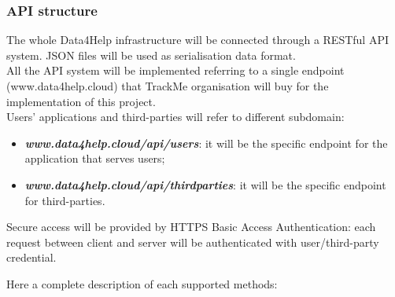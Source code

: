 \documentclass[DD.tex]{subfiles}
\begin{document}
\newpage

\subsubsection{API structure}
The whole Data4Help infrastructure will be connected through a RESTful API system. JSON files will be used as serialisation data format.\\
All the API system will be implemented referring to a single endpoint (www.data4help.cloud) that TrackMe organisation will buy for the implementation of this project.
\\Users' applications and third-parties will refer to different subdomain:

\begin{itemize}
	\item \textit{\textbf{www.data4help.cloud/api/users}}: it will be the specific endpoint for the application that serves users;
	\item \textit{\textbf{www.data4help.cloud/api/thirdparties}}: it will be the specific endpoint for third-parties.
\end{itemize}

Secure access will be provided by HTTPS Basic Access Authentication: each request between client and server will be authenticated with user/third-party credential.

Here a complete description of each supported methods:
\end{document}
